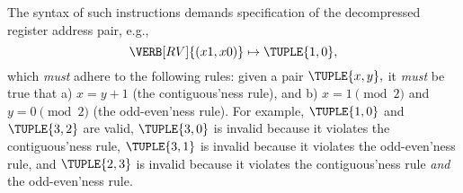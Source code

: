 The syntax of such instructions demands specification of the 
decompressed register address pair,
e.g., 
\[
\VERB[RV]{( x1, x0 )} \mapsto \TUPLE{ 1, 0 } ,
\]
which {\em must} adhere to the following rules: given a pair
$
\TUPLE{ x, y } ,
$
it {\em must} be true that
a) $x = y + 1$
   (the contiguous'ness rule),
   and
b) $x = 1 \pmod{2}$
   and 
   $y = 0 \pmod{2}$
   (the   odd-even'ness rule).
For example,
$\TUPLE{ 1, 0 }$ 
and 
$\TUPLE{ 3, 2 }$ are   valid,
$\TUPLE{ 3, 0 }$ is  invalid because it violates the contiguous'ness rule,
$\TUPLE{ 3, 1 }$ is  invalid because it violates the   odd-even'ness rule,
and
$\TUPLE{ 2, 3 }$ is  invalid because it violates the contiguous'ness rule 
                                       {\em and} the   odd-even'ness rule.

